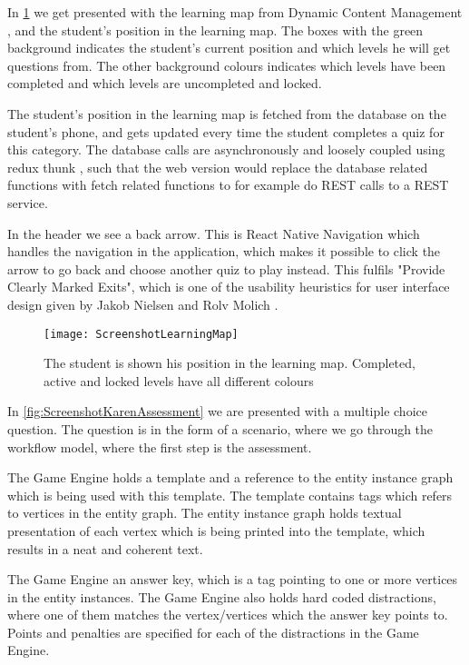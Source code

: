 In \ref{fig:ScreenshotLearningMap} we get presented with the learning map from Dynamic Content Management \parencite{Eide2008}, and the student's position in the learning map. The boxes with the green background indicates the student's current position and which levels he will get questions from. The other background colours indicates which levels have been completed and which levels are uncompleted and locked. 

The student's position in the learning map is fetched from the database on the student's phone, and gets updated every time the student completes a quiz for this category. The database calls are asynchronously and loosely coupled using redux thunk \parencite{ReduxJS-thunk}, such that the web version would replace the database related functions with fetch related functions to for example do REST calls to a REST service. 

In the header we see a back arrow. This is React Native Navigation \parencite{Wix} which handles the navigation in the application, which makes it possible to click the arrow to go back and choose another quiz to play instead. This fulfils "Provide Clearly Marked Exits", which is one of the usability heuristics for user interface design given by Jakob Nielsen and Rolv Molich \parencite{Molich1990}.

\begin{figure}[h!]
	\caption {The student is shown his position in the learning map. Completed, active and locked levels have all different colours}
	\label{fig:ScreenshotLearningMap}
	\texttt{[image: ScreenshotLearningMap]}
\end{figure}

In \ref{fig:ScreenshotKarenAssessment} we are presented with a multiple choice question. The question is in the form of a scenario, where we go through the workflow model, where the first step is the assessment.  

The Game Engine holds a template and a reference to the entity instance graph which is being used with this template. The template contains tags which refers to vertices in the entity graph. The entity instance graph holds textual presentation of each vertex which is being printed into the template, which results in a neat and coherent text. 

The Game Engine an answer key, which is a tag pointing to one or more vertices in the entity instances. The Game Engine also holds hard coded distractions, where one of them matches the vertex/vertices which the answer key points to. Points and penalties are specified for each of the distractions in the Game Engine.

